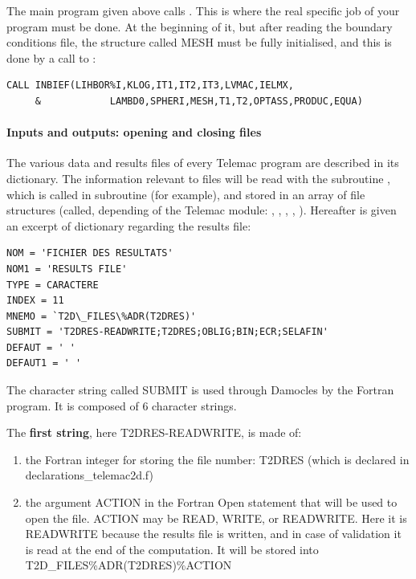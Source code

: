 The main program  given above calls .
This is where the real specific job of your program must be done. At the
beginning of it, but after reading the boundary conditions file, the
 structure called MESH must be fully initialised, and this
is done by a call to :

\begin{lstlisting}[language=TelFortran]
      CALL INBIEF(LIHBOR%I,KLOG,IT1,IT2,IT3,LVMAC,IELMX,
     &            LAMBD0,SPHERI,MESH,T1,T2,OPTASS,PRODUC,EQUA)
\end{lstlisting}

\paragraph{Inputs and outputs: opening and closing files}

The various data and results files of every Telemac program are described in
its dictionary. The information relevant to files will be read with the
subroutine , which is called in subroutine
 (for example), and stored in an array of file
structures (called, depending of the Telemac module: ,
, , ,
). Hereafter is given an excerpt of  dictionary
regarding the results file:

\begin{lstlisting}[language=TelemacCas]
NOM = 'FICHIER DES RESULTATS'
NOM1 = 'RESULTS FILE'
TYPE = CARACTERE
INDEX = 11
MNEMO = `T2D\_FILES\%ADR(T2DRES)'
SUBMIT = 'T2DRES-READWRITE;T2DRES;OBLIG;BIN;ECR;SELAFIN'
DEFAUT = ' '
DEFAUT1 = ' '
\end{lstlisting}

The character string called SUBMIT is used through Damocles by the Fortran program. It is composed of 6 character
strings.

The \textbf{first string}, here T2DRES-READWRITE, is made of:

\begin{enumerate}
\item  the Fortran integer for storing the file number: T2DRES (which is
  declared in declarations\_telemac2d.f)
\item  the argument ACTION in the Fortran Open statement that will be used to
  open the file. ACTION may be READ, WRITE, or READWRITE. Here it is READWRITE
  because the results file is written, and in case of validation it is read at
  the end of the computation. It will be stored into
  T2D\_FILES\%ADR(T2DRES)\%ACTION
\end{enumerate}

